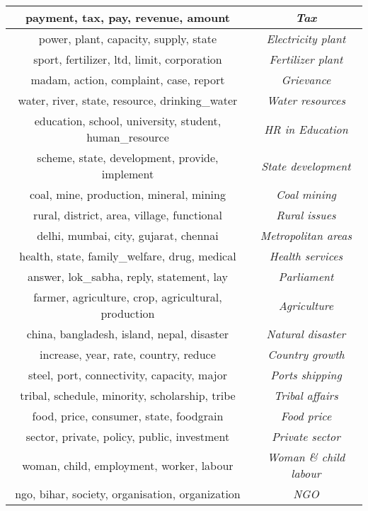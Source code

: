 \documentclass[10pt, a4paper]{article}
\begin{document}
\begin{table}[!htbp]
\begin{adjustbox}{width=0.99\linewidth}
\begin{tabular}{|c|c|}
        payment, tax, pay, revenue, amount & \textit{Tax} \\ \hline
        power, plant, capacity, supply, state & \textit{Electricity plant} \\ \hline
        sport, fertilizer, ltd, limit, corporation & \textit{Fertilizer plant} \\ \hline
        madam, action, complaint, case, report & \textit{Grievance} \\ \hline
        water, river, state, resource, drinking\_water & \textit{Water resources} \\ \hline
        education, school, university, student, human\_resource &  \textit{HR in Education} \\ \hline
        scheme, state, development, provide, implement & \textit{State development} \\ \hline
        coal, mine, production, mineral, mining & \textit{Coal mining} \\ \hline
        rural, district, area, village, functional & \textit{Rural issues} \\ \hline
        delhi, mumbai, city, gujarat, chennai & \textit{Metropolitan areas}  \\ \hline
        health, state, family\_welfare, drug, medical & \textit{Health services} \\ \hline
        answer, lok\_sabha, reply, statement, lay & \textit{Parliament} \\ \hline
        farmer, agriculture, crop, agricultural, production & \textit{Agriculture} \\ \hline
        china, bangladesh, island, nepal, disaster & \textit{Natural disaster} \\ \hline
        increase, year, rate, country, reduce & \textit{Country growth} \\ \hline
        steel, port, connectivity, capacity, major & \textit{Ports shipping} \\ \hline
        tribal, schedule, minority, scholarship, tribe & \textit{Tribal affairs} \\ \hline
        food, price, consumer, state, foodgrain & \textit{Food price} \\ \hline
        sector, private, policy, public, investment & \textit{Private sector} \\ \hline
        woman, child, employment, worker, labour & \textit{Woman \& child labour} \\ \hline
        ngo, bihar, society, organisation, organization & \textit{NGO} \\ \hline

\end{tabular}
\end{adjustbox}
\end{table}
\end{document}
